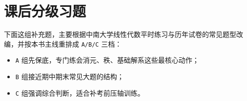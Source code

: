 \documentclass[11pt,oneside,UTF8]{ctexbook}
\begin{document}
\section{课后分级习题}

\begin{summarybox}[题型说明]
下面这组补充题，主要根据中南大学线性代数平时练习与历年试卷的常见题型改编，并按本书主线重排成 \texttt{A/B/C} 三档：
\begin{itemize}
  \item \texttt{A} 组先保底，专门练会消元、秩、基础解系这些最核心动作；
  \item \texttt{B} 组接近期中期末常见大题的结构；
  \item \texttt{C} 组强调综合判断，适合补考前压轴训练。
\end{itemize}
\end{summarybox}
\end{document}
